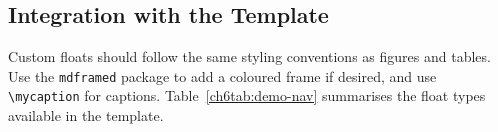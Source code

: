 \subsection{Integration with the Template}

Custom floats should follow the same styling conventions as figures and tables. Use the \texttt{mdframed} package to add a coloured frame if desired, and use \verb|\mycaption| for captions. Table~\ref{ch6tab:demo-nav} summarises the float types available in the template.

\begin{figure}[ht]
\centering
{}
\label{ch6fig:qualitative}
\end{figure}
